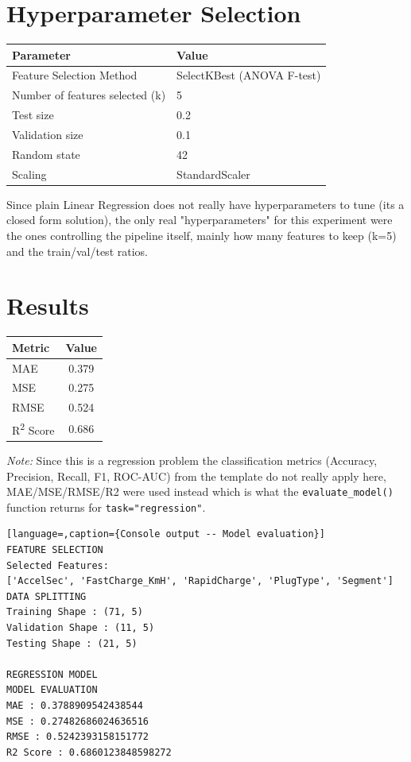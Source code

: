 \documentclass[12pt,a4paper]{article}
\begin{document}
\section{Hyperparameter Selection}

\begin{tabular}{ll}
\toprule
Parameter & Value\\
\midrule
Feature Selection Method & SelectKBest (ANOVA F-test) \\
Number of features selected (k) & 5 \\
Test size & 0.2 \\
Validation size & 0.1 \\
Random state & 42 \\
Scaling & StandardScaler \\
\bottomrule
\end{tabular}

Since plain Linear Regression does not really have hyperparameters to tune (its a closed form solution), the only real "hyperparameters" for this experiment were the ones controlling the pipeline itself, mainly how many features to keep (k=5) and the train/val/test ratios.

\section{Results}

\begin{tabular}{lc}
\toprule
Metric & Value\\
\midrule
MAE & 0.379 \\
MSE & 0.275 \\
RMSE & 0.524 \\
R\textsuperscript{2} Score & 0.686 \\
\bottomrule
\end{tabular}

\textit{Note: } Since this is a regression problem the classification metrics (Accuracy, Precision, Recall, F1, ROC-AUC) from the template do not really apply here, MAE/MSE/RMSE/R2 were used instead which is what the \texttt{evaluate\_model()} function returns for \texttt{task="regression"}.

\begin{lstlisting}[language=,caption={Console output -- Model evaluation}]
FEATURE SELECTION
Selected Features:
['AccelSec', 'FastCharge_KmH', 'RapidCharge', 'PlugType', 'Segment']
DATA SPLITTING
Training Shape : (71, 5)
Validation Shape : (11, 5)
Testing Shape : (21, 5)

REGRESSION MODEL
MODEL EVALUATION
MAE : 0.3788909542438544
MSE : 0.27482686024636516
RMSE : 0.5242393158151772
R2 Score : 0.6860123848598272
\end{lstlisting}
\end{document}
